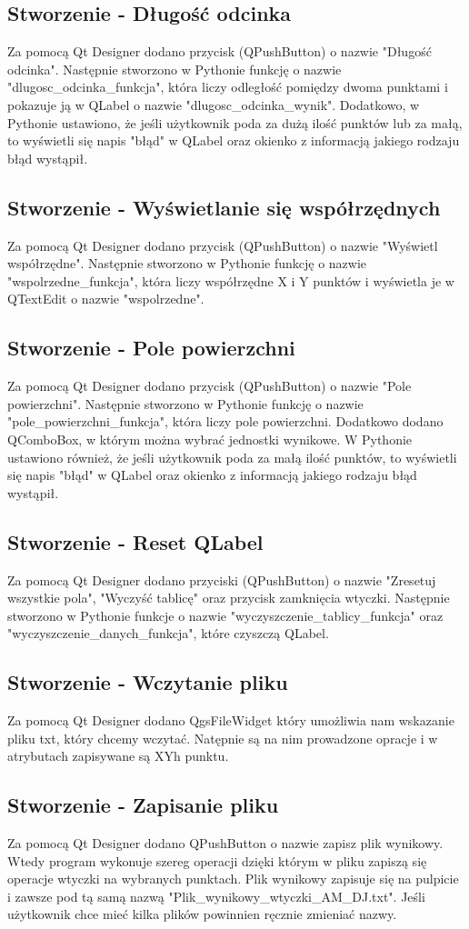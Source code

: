 \subsection{Stworzenie - Długość odcinka}
Za pomocą Qt Designer dodano przycisk (QPushButton) o nazwie "Długość odcinka". Następnie stworzono w Pythonie funkcję o nazwie "dlugosc\_odcinka\_funkcja", która liczy odległość pomiędzy dwoma punktami i pokazuje ją w QLabel o nazwie "dlugosc\_odcinka\_wynik". Dodatkowo, w Pythonie ustawiono, że jeśli użytkownik poda za dużą ilość punktów lub za małą, to wyświetli się napis "błąd" w QLabel oraz okienko z informacją jakiego rodzaju błąd wystąpił.

\subsection{Stworzenie - Wyświetlanie się współrzędnych}
Za pomocą Qt Designer dodano przycisk (QPushButton) o nazwie "Wyświetl współrzędne". Następnie stworzono w Pythonie funkcję o nazwie "wspolrzedne\_funkcja", która liczy współrzędne X i Y punktów i wyświetla je w QTextEdit o nazwie "wspolrzedne".

\subsection{Stworzenie - Pole powierzchni}
Za pomocą Qt Designer dodano przycisk (QPushButton) o nazwie "Pole powierzchni". Następnie stworzono w Pythonie funkcję o nazwie "pole\_powierzchni\_funkcja", która liczy pole powierzchni. Dodatkowo dodano QComboBox, w którym można wybrać jednostki wynikowe. W Pythonie ustawiono również, że jeśli użytkownik poda za małą ilość punktów, to wyświetli się napis "błąd" w QLabel oraz okienko z informacją jakiego rodzaju błąd wystąpił.

\subsection{Stworzenie - Reset QLabel}
Za pomocą Qt Designer dodano przyciski (QPushButton) o nazwie "Zresetuj wszystkie pola", "Wyczyść tablicę" oraz przycisk zamknięcia wtyczki. Następnie stworzono w Pythonie funkcje o nazwie "wyczyszczenie\_tablicy\_funkcja" oraz "wyczyszczenie\_danych\_funkcja", które czyszczą QLabel.

\subsection{Stworzenie - Wczytanie pliku}
Za pomocą Qt Designer dodano QgsFileWidget który umożliwia nam wskazanie pliku txt, który chcemy wczytać. Natępnie są na nim prowadzone opracje i w atrybutach zapisywane są XYh punktu. 

\subsection{Stworzenie - Zapisanie pliku}
Za pomocą Qt Designer dodano QPushButton o nazwie zapisz plik wynikowy. Wtedy program wykonuje szereg operacji dzięki którym w pliku zapiszą się operacje wtyczki na wybranych punktach. Plik wynikowy zapisuje się na pulpicie i zawsze pod tą samą nazwą "Plik\_wynikowy\_wtyczki\_AM\_DJ.txt". Jeśli użytkownik chce mieć kilka plików powinnien ręcznie zmieniać nazwy.
